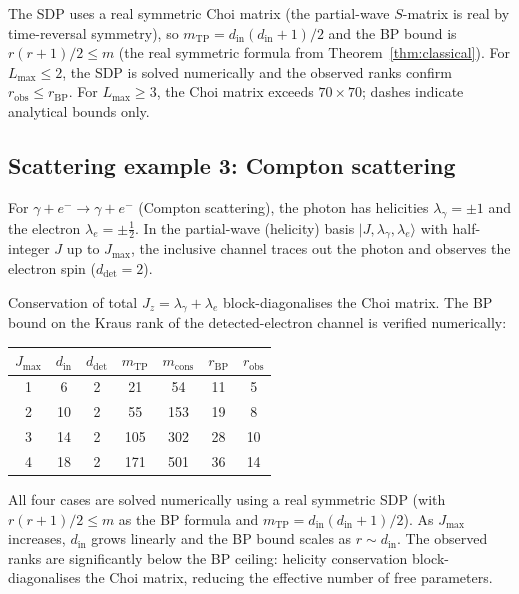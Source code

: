 \documentclass[11pt,a4paper]{article}
\theoremstyle{definition}
\newcommand{\ket}[1]{|#1\rangle}
\begin{document}
\noindent
The SDP uses a real symmetric Choi matrix (the partial-wave
$S$-matrix is real by time-reversal symmetry), so
$m_{\mathrm{TP}} = d_{\mathrm{in}}(d_{\mathrm{in}}+1)/2$ and the
BP bound is $r(r+1)/2 \leq m$ (the real symmetric formula from
Theorem~\ref{thm:classical}).
For $L_{\max} \leq 2$, the SDP is solved numerically and the observed
ranks confirm $r_{\mathrm{obs}} \leq r_{\mathrm{BP}}$.
For $L_{\max} \geq 3$, the Choi matrix exceeds $70 \times 70$;
dashes indicate analytical bounds only.

\subsection{Scattering example 3: Compton scattering}
\label{sec:scatter-compton}

For $\gamma + e^- \to \gamma + e^-$ (Compton scattering), the photon
has helicities $\lambda_\gamma = \pm 1$ and the electron
$\lambda_e = \pm \tfrac{1}{2}$.  In the partial-wave (helicity) basis
$\ket{J, \lambda_\gamma, \lambda_e}$ with half-integer $J$ up to
$J_{\max}$, the inclusive channel traces out the photon and observes
the electron spin ($d_{\mathrm{det}} = 2$).

Conservation of total $J_z = \lambda_\gamma + \lambda_e$
block-diagonalises the Choi matrix.  The BP bound on the Kraus rank
of the detected-electron channel is verified numerically:

\medskip
\begin{center}
\begin{tabular}{ccccccc}
\toprule
$J_{\max}$ & $d_{\mathrm{in}}$ & $d_{\mathrm{det}}$
  & $m_{\mathrm{TP}}$ & $m_{\mathrm{cons}}$ & $r_{\mathrm{BP}}$
  & $r_{\mathrm{obs}}$ \\
\midrule
1 & 6   & 2 & 21   & 54   & 11 & 5 \\
2 & 10  & 2 & 55   & 153  & 19 & 8 \\
3 & 14  & 2 & 105  & 302  & 28 & 10 \\
4 & 18  & 2 & 171  & 501  & 36 & 14 \\
\bottomrule
\end{tabular}
\end{center}
\medskip

\noindent
All four cases are solved numerically using a real symmetric SDP
(with $r(r+1)/2 \leq m$ as the BP formula and
$m_{\mathrm{TP}} = d_{\mathrm{in}}(d_{\mathrm{in}}+1)/2$).
As $J_{\max}$ increases, $d_{\mathrm{in}}$ grows linearly and the
BP bound scales as $r \sim d_{\mathrm{in}}$.  The observed ranks are
significantly below the BP ceiling: helicity conservation
block-diagonalises the Choi matrix, reducing the effective number of
free parameters.
\end{document}
